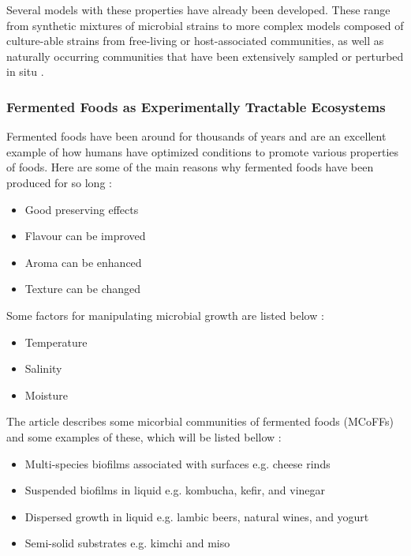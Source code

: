 Several models with these properties have already been developed. These range from synthetic mixtures of microbial strains to more complex models composed of culture-able strains from free-living or host-associated communities, as well as naturally occurring communities that have been extensively sampled or perturbed in situ \cite*{L1-FermentedFoods}.

\subsubsection*{Fermented Foods as Experimentally Tractable Ecosystems}
Fermented foods have been around for thousands of years and are an excellent example of how humans have optimized conditions to promote various properties of foods. Here are some of the main reasons why fermented foods have been produced for so long \cite*{L1-FermentedFoods}:
\begin{highlight}[htbp]
    \begin{itemize}
    \item Good preserving effects
    \item Flavour can be improved
    \item Aroma can be enhanced
    \item Texture can be changed
    \end{itemize}
\end{highlight}

Some factors for manipulating microbial growth are listed below \cite*{L1-FermentedFoods}:
\begin{highlight}[htbp]
    \begin{itemize}
    \item Temperature
    \item Salinity
    \item Moisture
    \end{itemize}
\end{highlight}

\vspace*{1em}
The article describes some micorbial communities of fermented foods (MCoFFs) and some examples of these, which will be listed bellow \cite*{L1-FermentedFoods}:
\begin{highlight}[htbp]
    \begin{itemize}
    \item Multi-species biofilms associated with surfaces 
    \subitem e.g. cheese rinds
    \vspace*{0.5em}

    \item Suspended biofilms in liquid
    \subitem e.g. kombucha, kefir, and vinegar
    \vspace*{0.5em}

    \item Dispersed growth in liquid
    \subitem e.g. lambic beers, natural wines, and yogurt
    \vspace*{0.5em}

    \item Semi-solid substrates
    \subitem e.g. kimchi and miso
    \end{itemize}
\end{highlight}


